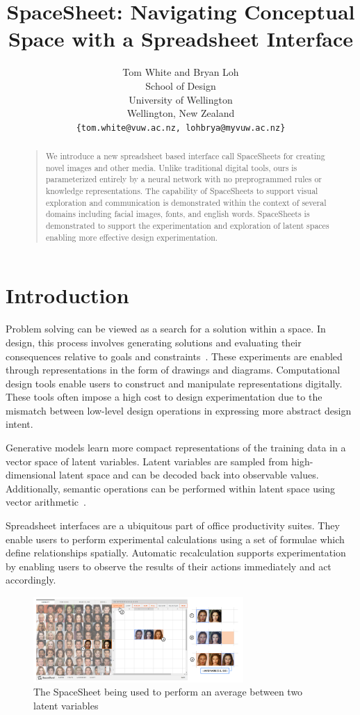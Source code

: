 \documentclass[letterpaper]{article}
\title{SpaceSheet: Navigating Conceptual Space with a Spreadsheet Interface}
\author{
  Tom White and Bryan Loh\\
  School of Design\\University of Wellington\\Wellington, New Zealand \\
  \texttt{\{tom.white@vuw.ac.nz, lohbrya@myvuw.ac.nz\}} \\
}
\begin{document}
 
\maketitle
\begin{abstract}
\begin{quote}
We introduce a new spreadsheet based interface call SpaceSheets for creating novel images and other media. Unlike traditional digital tools, ours is parameterized entirely by a neural network with no preprogrammed rules or knowledge representations. The capability of SpaceSheets to support visual exploration and communication is demonstrated within the context of several domains including facial images, fonts, and english words. SpaceSheets is demonstrated to support the experimentation and exploration of latent spaces enabling more effective design experimentation.
\end{quote}
\end{abstract}

\section{Introduction}

Problem solving can be viewed as a search for a solution within a space. In design, this process involves generating solutions and evaluating their consequences relative to goals and constraints~\cite{simon95}. These experiments are enabled through representations in the form of drawings and diagrams. Computational design tools enable users to construct and manipulate representations digitally. These tools often impose a high cost to design experimentation due to the mismatch between low-level design operations in expressing more abstract design intent.

Generative models learn more compact representations of the training data in a vector space of latent variables. Latent variables are sampled from high-dimensional latent space and can be decoded back into observable values. Additionally, semantic operations can be performed within latent space using vector arithmetic~\cite{white16}.

Spreadsheet interfaces are a ubiquitous part of office productivity suites. They enable users to perform experimental calculations using a set of formulae which define relationships spatially. Automatic recalculation supports experimentation by enabling users to observe the results of their actions immediately and act accordingly.

\begin{figure}[ht]
  \centering
  \includegraphics[width=8cm]{figs/01-hero-diagram.png}
  \caption{The SpaceSheet being used to perform an average between two latent variables}
\end{figure}
\end{document}
